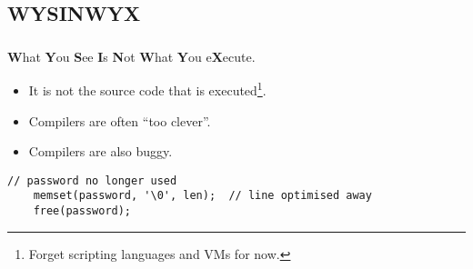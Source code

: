 \documentclass[compress]{beamer}
\begin{document}
\subsection{WYSINWYX}
\begin{frame}[fragile]
	\frametitle{\insertsubsection}

	\textbf{\Large W}hat \textbf{\Large Y}ou \textbf{\Large S}ee \textbf{\Large I}s \textbf{\Large N}ot \textbf{\Large W}hat \textbf{\Large Y}ou e\textbf{\Large X}ecute.
	\vfill

	\begin{itemize}
		\item It is not the source code that is executed\footnote{Forget scripting languages and VMs for now.}.
		\item Compilers are often ``too clever''.
		\item Compilers are also buggy.
	\end{itemize}
	\vfill

	\begin{lstlisting}[caption={A compiler-induced vulnerability.}]
	// password no longer used                                                      
	memset(password, '\0', len);  // line optimised away                            
	free(password);                                                                 
	\end{lstlisting}
	\vfill

\end{frame}
\end{document}
